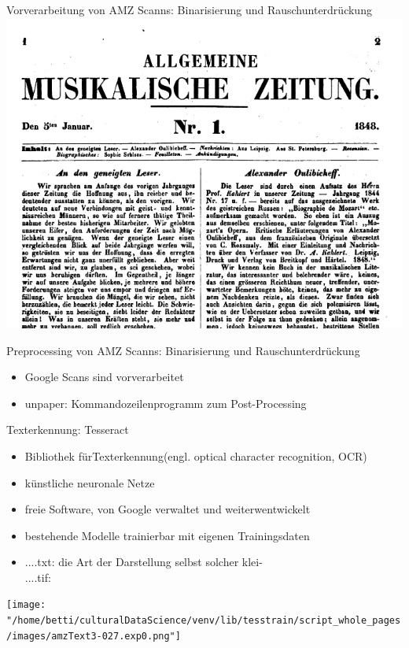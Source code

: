 \documentclass{beamer}
\begin{document}
\begin{frame}{Vorverarbeitung von AMZ Scanns: Binarisierung und Rauschunterdrückung}
	\includegraphics[scale=.38]{"data/processed.png"}
\end{frame}
\begin{frame}{Preprocessing von AMZ Scanns: Binarisierung und Rauschunterdrückung}
	\begin{itemize}
		\item Google Scans sind vorverarbeitet
		\item unpaper: Kommandozeilenprogramm zum Post-Processing
	\end{itemize}
\end{frame}
\begin{frame}{Texterkennung: Tesseract}
\begin{itemize}
		\item Bibliothek fürTexterkennung(engl. optical character recognition, OCR)
		\item künstliche neuronale Netze
		\item freie Software, von Google verwaltet und weiterwentwickelt
		\item bestehende Modelle trainierbar mit eigenen Trainingsdaten
		\item ....txt: \glqq  die Art der Darstellung selbst solcher klei-\grqq \\....tif:
	\end{itemize}
\texttt{[image: "/home/betti/culturalDataScience/venv/lib/tesstrain/script\_whole\_pages/images/amzText3-027.exp0.png"]}
\end{frame}
\end{document}
